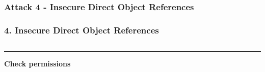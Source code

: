 \subsubsection{Attack 4 - Insecure Direct Object References}

\begin{frame}
\frametitle{4. Insecure Direct Object References}
\begin{columns}
\begin{column}{0.1\linewidth}\end{column}
\begin{column}{0.7\linewidth}
\Lst
\end{column}
\end{columns}
\hrule
\begin{center}
{\Huge\bfseries Check permissions}
\end{center}


\end{frame}
